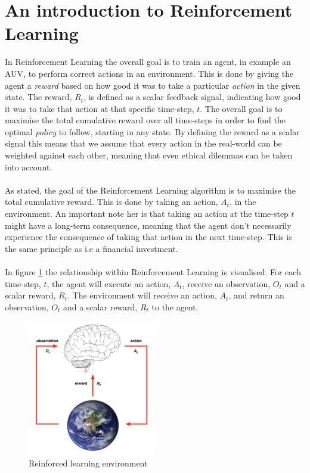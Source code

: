 \section{An introduction to Reinforcement Learning}
In Reinforcement Learning the overall goal is to train an agent, in example an AUV, to perform correct actions in an environment. This is done by giving the agent a \textit{reward} based on how good it was to take a particular \textit{action} in the given state. The reward, $R_{t}$, is defined as a scalar feedback signal, indicating how good it was to take that action at that specific time-step, $t$. The overall goal is to maximise the total cumulative reward over all time-steps in order to find the optimal \textit{policy} to follow, starting in any state. By defining the reward as a scalar signal this means that we assume that every action in the real-world can be weighted against each other, meaning that even ethical dilemmas can be taken into account.\\\\
As stated, the goal of the Reinforcement Learning algorithm is to maximise the total cumulative reward. This is done by taking an action, $A_{t}$, in the environment. An important note her is that taking an action at the time-step $t$ might have a long-term consequence, meaning that the agent don't necessarily experience the consequence of taking that action in the next time-step. This is the same principle as i.e a financial investment.\\\\
In figure \ref{fig:environment} the relationship within Reinforcement Learning is visualised. For each time-step, $t$, the agent will execute an action, $A_{t}$, receive an observation, $O_{t}$ and a scalar reward, $R_{t}$. The environment will receive an action, $A_{t}$, and return an observation, $O_{t}$ and a scalar reward, $R_{t}$ to the agent. 
\begin{figure}[H]
    \centering
    \includegraphics[width=0.5\textwidth]{images/chap2/Agent_environment.png}
    \caption{Reinforced learning environment \cite{Silver}}
    \label{fig:environment}
\end{figure}

